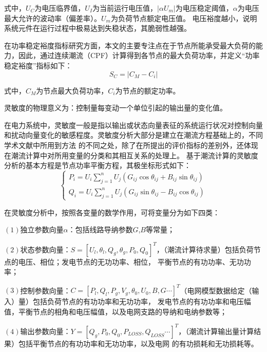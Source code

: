 式中，$U_C$为电压临界值，$U_I$为当前运行电压值，$\left|\alpha U_{m}\right|$为电压稳定阈值，$\alpha$为电压最大允许的波动率（偏差率）。$U_m$为负荷节点额定电压值。
电压裕度越小，说明系统元件在运行过程中极易达到失稳状态，其脆弱性越强。


在功率稳定裕度指标研究方面，本文的主要专注点在于节点所能承受最大负荷的能力，因此，通过连续潮流（CPF）计算得到各节点的最大负荷功率，并定义“功率稳定裕度”指标如下：
\begin{equation}
  S_C=\left|C_M-C_i\right|
  \end{equation}

式中，$C_M$为节点最大负荷功率，$C_i$为节点的额定功率。


灵敏度的物理意义为：控制量每变动一个单位引起的输出量的变化值。

在电力系统中，灵敏度一般是指以输出或状态向量表征的系统运行状况对控制向量和扰动向量变化的敏感程度。灵敏度分析大部分是建立在潮流方程基础上的，不同学术文献中所用到方法
的不同之处，除了在所提出的评价指标的差别外，还体现在潮流计算中对所用变量的分类和其相互关系的处理上。
基于潮流计算的灵敏度分析的基本方程是节点功率平衡方程，其极坐标形式如下：
\begin{equation}
  \left\{\begin{array}{l}{P_{i}=U_{i} \sum_{j=1}^{n} U_{j}\left(G_{i j} \cos \theta_{i j}+B_{i j} \sin \theta_{i j}\right)} \\ 
{Q_{i}=U_{i} \sum_{j=1}^{n} U_{j}\left(G_{i j} \sin \theta_{i j}-B_{i j} \cos \theta_{i j}\right)}\end{array}\right.  
\end{equation}

在灵敏度分析中，按照各变量的数学作用，可将变量分为如下四类：

$(1)$独立参数向量$\alpha$：包括线路导纳参数$G$,$B$等常量；

$(2)$状态参数向量：$S=\left[U_{l}, \theta_{l}, Q_{g}, \theta_{g}, P_{0}, Q_{0}\right]^{T}$，（潮流计算待求量）包括负荷节点的电压、相位；发电节点的无功功率、相位，
平衡节点的有功功率、无功功率；

$(3)$控制参数向量：$C=\left[P_{l}, Q_{l}, P_{g}, V_{g}, \theta_{0}, U_{0}, B, G \cdots\right]^{T}$（电网模型数据给定（输入）量）包括负荷节点的有功功率和无功功率，
发电节点的有功功率和电压幅值，平衡节点的相角和电压幅值，以及电网支路的导纳和电纳参数等；

$(4)$输出参数向量：$Y=\left[Q_{g}, P_{0}, Q_{0}, P_{L O S S}, Q_{L O S S} \cdots\right]^{T}$，（潮流计算输出量计算结果）包括平衡节点的有功功率和无功功率，以及电网
的有功损耗和无功损耗等。

